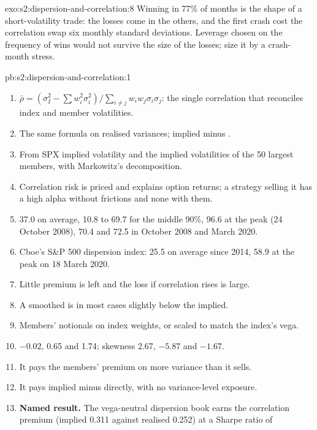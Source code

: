 \begin{solution}{exo:s2:dispersion-and-correlation:8}
Winning in 77\% of months is the shape of a short-volatility trade: the losses come in the others, and the first crash cost the correlation swap six
monthly standard deviations. Leverage chosen on the frequency of wins would not survive the size of the losses; size it by a crash-month stress.
\end{solution}

\begin{solution}{pb:s2:dispersion-and-correlation:1}
\begin{enumerate}
\item $\bar\rho = (\sigma_I^2 - \sum w_i^2\sigma_i^2)/\sum_{i \ne j} w_i w_j\sigma_i\sigma_j$: the single correlation that reconciles index and member
volatilities.
\item The same formula on realised variances; implied minus .
\item From SPX implied volatility and the implied volatilities of the 50 largest members, with Markowitz's decomposition.
\item Correlation risk is priced and explains option returns; a strategy selling it has a high alpha without frictions and none with them.
\item 37.0 on average, 10.8 to 69.7 for the middle 90\%, 96.6 at the peak (24 October 2008), 70.4 and 72.5 in October 2008 and March 2020.
\item Cboe's S\&P 500 dispersion index: 25.5 on average since 2014, 58.9 at the peak on 18 March 2020.
\item Little premium is left and the loss if correlation rises is large.
\item A smoothed  is in most cases slightly below the implied.
\item Members' notionals on index weights, or scaled to match the index's vega.
\item $-0.02$, 0.65 and 1.74; skewness 2.67, $-5.87$ and $-1.67$.
\item It pays the members' premium on more variance than it sells.
\item It pays implied minus  directly, with no variance-level exposure.
\item \textbf{Named result.} The vega-neutral dispersion book earns the correlation premium (implied 0.311 against realised 0.252) at a Sharpe ratio of

\end{enumerate}
\end{solution}
